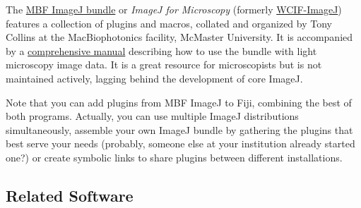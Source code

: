 The \href{http://www.macbiophotonics.ca/imagej/}{MBF ImageJ bundle}
or \emph{ImageJ for Microscopy} (formerly \href{http://www.uhnres.utoronto.ca/facilities/wcif/imagej/}{WCIF-ImageJ})
features a collection of plugins and macros, collated and organized
by Tony Collins at the MacBiophotonics facility, McMaster University.
It is accompanied by a \href{http://www.macbiophotonics.ca/imagej/}{comprehensive manual}
describing how to use the bundle with light microscopy image data.
It is a great resource for microscopists but is not maintained actively,
lagging behind the development of core ImageJ.

Note that you can add plugins from MBF ImageJ to Fiji, combining the
best of both programs. Actually, you can use multiple ImageJ distributions
simultaneously, assemble your own ImageJ bundle by gathering the plugins
that best serve your needs (probably, someone else at your institution
already started one?) or create symbolic links to share plugins between
different installations.




\subsection{Related Software}


